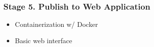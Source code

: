 \documentclass[
]{article}
\providecommand{\tightlist}{%
  \setlength{\itemsep}{0pt}\setlength{\parskip}{0pt}}
\begin{document}
\hypertarget{stage-5.-publish-to-web-application}{%
\subsubsection{Stage 5. Publish to Web
Application}\label{stage-5.-publish-to-web-application}}

\begin{itemize}
\tightlist
\item
  Containerization w/ Docker\\
\item
  Basic web interface
\end{itemize}
\end{document}
